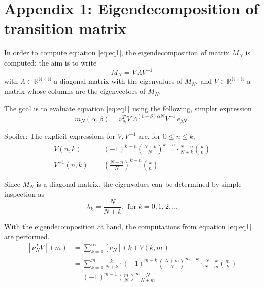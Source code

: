 \documentclass{article}
\newcommand{\N}{\mathbb{N}}
\newcommand{\R}{\mathbb{R}}
\newcommand{\ppar}[1]{\left( #1 \right)}
\newcommand{\spar}[1]{\left[ #1 \right]}
\begin{document}
\section{Appendix 1: Eigendecomposition of transition matrix}

In order to compute equation \eqref{eq:eq1}, the eigendecomposition of matrix $M_N$ is computed; the aim is to write
\begin{equation}
    M_N = V\, \Lambda V^{-1}
\end{equation}
with $\Lambda \in \R^{\N \times \N}$ a diagonal matrix with the eigenvalues of $M_N$, and $V\in \R^{\N \times \N}$ a matrix whose columns are the eigenvectors of $M_N$. 

The goal is to evaluate equation \eqref{eq:eq1} using the following, simpler expression
\begin{equation}
    m_N(\alpha, \beta) = \nu_N^T V\, \Lambda^{(1+\beta) \alpha N} V^{-1}\, e_{\beta N}.
\end{equation}

Spoiler: The explicit expressions for $V, V^{-1}$ are, for $0\leq n\leq k$, 
\begin{align}
    V(n,k) &= (-1)^{k-n} \ppar{\frac{N+k}{N}}^{k-n} \cdot \frac{N+n}{N+k} \binom{k}{n}
    \\
    V^{-1}(n,k) &=
    \ppar{\frac{N+n}{N}}^{k-n} \binom{k}{n}
\end{align}

Since $M_N$ is a diagonal matrix, the eigenvalues can be determined by simple inspection as
\begin{equation}
    \lambda_k = \frac{N}{N+k}, \text{ for } k=0, 1, 2, \dots
\end{equation}

With the eigendecomposition at hand, the computations from equation \eqref{eq:eq1} are performed.
\begin{align*}
    \spar{\nu_N^T V}(m) &=
    \sum_{k=0}^\infty \spar{\nu_N}(k)\, V(k,m) \\
    &=
    \sum_{k=0}^m
    \frac{k}{N+k} \cdot
    (-1)^{m-k} \ppar{\frac{N+m}{N}}^{m-k} \cdot \frac{N+k}{N+m} \binom{m}{k}
    \\
    &=
    (-1)^{m-1} \ppar{\frac{m}{N}}^m \frac{N}{N+m}
\end{align*}

\end{document}
